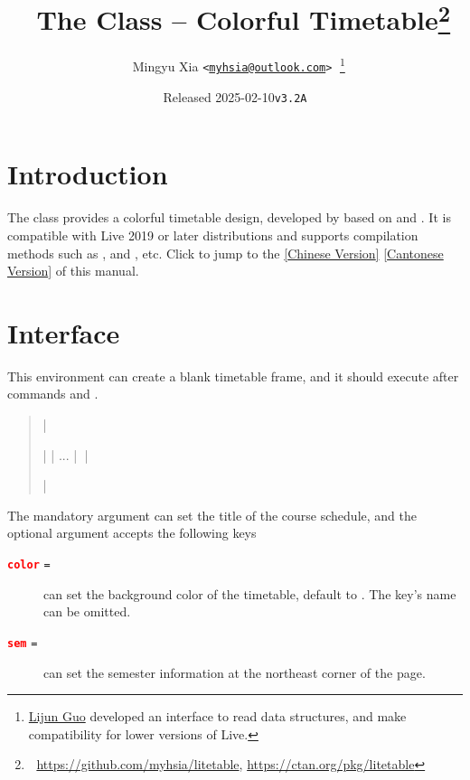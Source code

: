 \documentclass[10pt, letterpaper]{l3doc}
\title{^^X
  The \cls{litetable} Class -- Colorful Timetable\thanks
    {^^X
      \url{https://github.com/myhsia/litetable},
      \url{https://ctan.org/pkg/litetable}
    }
}
\author{^^X
  Mingyu Xia \texttt{<\href{mailto:myhsia@outlook.com}{myhsia@outlook.com}>}^^X
  \thanks{
    \href{https://github.com/ljguo1020}{Lijun Guo} developed an interface to
    read \meta{left} \cmd{->} \meta{right} data structures, and make
    compatibility for lower versions of \hologo {TeX} Live.
  }
}
\date{Released 2025-02-10\quad \texttt{v3.2A}}
\def \key #1{\textcolor{red}{\textbf{\texttt{#1}}}}
\def \keyval #1#2{\key{#1} \normalfont \texttt{=} \meta{\textup{#2}}}
\begin{document}
\maketitle

\section{Introduction}

The  class provides a colorful timetable design, developed by
 based on  and . It is compatible with
 Live 2019 or later distributions and supports compilation methods
such as ,  and , etc.
Click to jump to the
\href{http://mirrors.ctan.org/macros/latex/contrib/^^X
  litetable/doc/litetable-zh-cn.pdf^^X
}{[\textsf{Chinese Version}]}
\href{http://mirrors.ctan.org/macros/latex/contrib/^^X
  litetable/doc/litetable-zh-hk.pdf^^X
}{[\textsf{Cantonese Version}]} of this manual.

\section{Interface}

This environment can create a blank timetable frame,
and it should execute after commands  and .
\begin{quote}
  |\begin{litetable}|
      | ... |^^X
  |\end{litetable}|
\end{quote}
The mandatory argument can set the title of the course schedule, and
the optional argument accepts the following keys
\begin{description}
  \item [\keyval{color}{color}] can set the background color of the timetable,
  default to . The key's name can be omitted.
  \item [\keyval{sem}{string}] can set the semester information
  at the northeast corner of the page.
\end{description}
\end{document}
